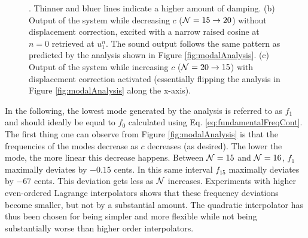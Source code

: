 \begin{figure}[ht!]
{    . Thinner and bluer lines indicate a higher amount of damping. (b) Output of the system while decreasing $c$ ($\mathcal{N} = 15 \rightarrow 20$) without displacement correction, excited with a narrow raised cosine at $n=0$ retrieved at $u_1^n$. The sound output follows the same pattern as predicted by the analysis shown in Figure \ref{fig:modalAnalysis}. (c) Output of the system while increasing $c$ ($\mathcal{N} = 20 \rightarrow 15$) with displacement correction activated (essentially flipping the analysis in Figure \ref{fig:modalAnalysis} along the x-axis). \label{fig:analysisAndSpecs}}
\end{figure}
In the following, %
the lowest mode generated by the analysis is referred to as $f_1$ and should ideally be equal to $f_0$ calculated using Eq. \eqref{eq:fundamentalFreqCont}. %
%
The first thing one can observe from Figure \ref{fig:modalAnalysis} is that the frequencies of the modes decrease as $c$ decreases (as desired). The lower the mode, the more linear this decrease happens. Between $\mathcal{N} = 15$ and $\mathcal{N} = 16$, $f_1$ maximally deviates by $-0.15$ cents. In this same interval $f_{15}$ maximally deviates by $-67$ cents. This deviation %
gets %
less as $\mathcal{N}$ increases. %
%
Experiments with higher even-ordered Lagrange interpolators shows that these frequency deviations become smaller, but not by a substantial amount. The quadratic interpolator has thus been chosen for being simpler and more flexible while not being substantially worse than higher order interpolators.

